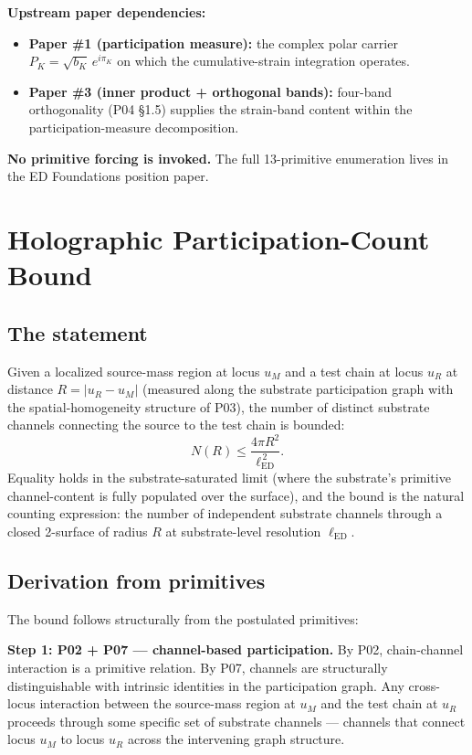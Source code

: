 \documentclass[11pt,a4paper]{article}
\begin{document}
\textbf{Upstream paper dependencies:}

\begin{itemize}[noitemsep]
\item \textbf{Paper \#1 (participation measure):} the complex polar carrier $P_K = \sqrt{b_K}\,e^{i\pi_K}$ on which the cumulative-strain integration operates.
\item \textbf{Paper \#3 (inner product + orthogonal bands):} four-band orthogonality (P04 \S1.5) supplies the strain-band content within the participation-measure decomposition.
\end{itemize}

\textbf{No primitive forcing is invoked.} The full 13-primitive enumeration lives in the ED Foundations position paper.

\section{Holographic Participation-Count Bound}

\subsection{The statement}

Given a localized source-mass region at locus $u_M$ and a test chain at locus $u_R$ at distance $R = |u_R - u_M|$ (measured along the substrate participation graph with the spatial-homogeneity structure of P03), the number of distinct substrate channels connecting the source to the test chain is bounded:
\[
N(R) \leq \frac{4\pi R^2}{\ell_\mathrm{ED}^{\,2}}.
\]
Equality holds in the substrate-saturated limit (where the substrate's primitive channel-content is fully populated over the surface), and the bound is the natural counting expression: the number of independent substrate channels through a closed 2-surface of radius $R$ at substrate-level resolution $\ell_\mathrm{ED}$.

\subsection{Derivation from primitives}

The bound follows structurally from the postulated primitives:

\textbf{Step 1: P02 + P07 --- channel-based participation.} By P02, chain-channel interaction is a primitive relation. By P07, channels are structurally distinguishable with intrinsic identities in the participation graph. Any cross-locus interaction between the source-mass region at $u_M$ and the test chain at $u_R$ proceeds through some specific set of substrate channels --- channels that connect locus $u_M$ to locus $u_R$ across the intervening graph structure.
\end{document}
